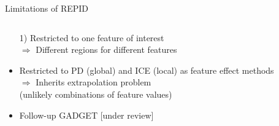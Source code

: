 \documentclass[10pt,compress,t,notes=noshow, xcolor=table]{beamer}
\begin{document}
\begin{frame}{Limitations of REPID}

\begin{columns}[T, totalwidth = \textwidth]
    \begin{column}{0.6\textwidth}

      \begin{itemize}
  \item[1)] Restricted to one feature of interest \\
  $\Rightarrow$ Different regions for different features \\
  \item<2->[2)] Restricted to PD (global) and ICE (local) as feature effect methods\\
  $\Rightarrow$ Inherits extrapolation problem\\
  (unlikely combinations of feature values)
   \item<2->[$\leadsto$] Follow-up GADGET %
[under review]
  \end{itemize}


    \end{column}


\end{columns}
\end{frame}
\end{document}
